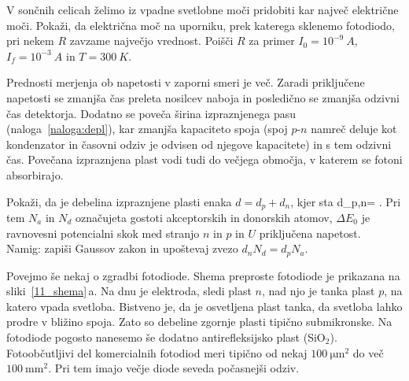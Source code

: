 \begin{definition}
\label{naloga:optR}
V sončnih celicah želimo iz vpadne svetlobne moči pridobiti kar največ električne moči.
Pokaži, da električna moč na uporniku, prek katerega sklenemo fotodiodo, pri nekem $R$
zavzame največjo vrednost. Poišči $R$ za primer $I_0 = 10^{-9}~\si{A}$, $I_f = 10^{-3}~\si{A}$ 
in $T=300~\si{K}$.
\end{definition}

Prednosti merjenja ob napetosti v zaporni smeri je več. 
Zaradi priključene napetosti se zmanjša čas preleta
nosilcev naboja in posledično se zmanjša odzivni čas detektorja.
Dodatno se poveča širina izpraznjenega pasu (naloga~\ref{naloga:depl}), kar zmanjša kapaciteto spoja 
(spoj $p$-$n$ namreč deluje kot  
kondenzator in časovni odziv je odvisen od njegove kapacitete) in s tem odzivni čas. Povečana
izpraznjena plast vodi tudi do večjega območja, v katerem se fotoni absorbirajo. 

\begin{definition}
\label{naloga:depl}
Pokaži, da je debelina izpraznjene plasti enaka $d = d_p+d_n$, kjer sta 
\beq
d_{p,n}= .
\eeq
Pri tem $N_a$ in $N_d$ označujeta gostoti akceptorskih in donorskih atomov, $\Delta E_0$ je ravnovesni 
potencialni skok med stranjo $n$ in $p$ in $U$ priključena napetost. \\ Namig: zapiši Gaussov zakon in 
upoštevaj zvezo $d_n N_d = d_p N_a$.
\end{definition}

Povejmo še nekaj o zgradbi fotodiode. Shema preproste fotodiode je prikazana na 
sliki~\ref{11_shema}\,a.
Na dnu je elektroda, sledi plast $n$, nad njo je tanka plast $p$, na katero vpada svetloba.
Bistveno je, da je osvetljena plast tanka, da svetloba lahko prodre v bližino spoja. Zato so 
debeline zgornje plasti tipično submikronske. Na fotodiode pogosto nanesemo
še dodatno antirefleksijsko plast (SiO$_2$). 
Fotoobčutljivi del komercialnih fotodiod
meri tipično od nekaj $100~\si{\micro\meter}^2$  do več $100~\si{\milli\metre}^2$. Pri 
tem imajo večje diode seveda počasnejši odziv. 

